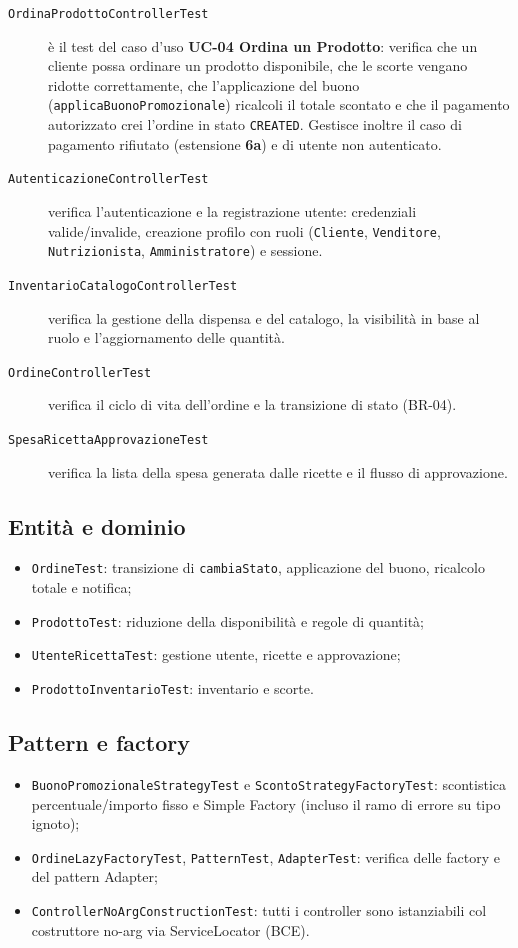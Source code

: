 \begin{description}
    \item[\texttt{OrdinaProdottoControllerTest}] è il test del caso d'uso
    \textbf{UC-04 Ordina un Prodotto}: verifica che un cliente possa ordinare
    un prodotto disponibile, che le scorte vengano ridotte correttamente, che
    l'applicazione del buono (\texttt{applicaBuonoPromozionale}) ricalcoli il
    totale scontato e che il pagamento autorizzato crei l'ordine in stato
    \texttt{CREATED}. Gestisce inoltre il caso di pagamento rifiutato
    (estensione \textbf{6a}) e di utente non autenticato.
    \item[\texttt{AutenticazioneControllerTest}] verifica l'autenticazione e la
    registrazione utente: credenziali valide/invalide, creazione profilo con
    ruoli (\texttt{Cliente}, \texttt{Venditore}, \texttt{Nutrizionista},
    \texttt{Amministratore}) e sessione.
    \item[\texttt{InventarioCatalogoControllerTest}] verifica la gestione della
    dispensa e del catalogo, la visibilità in base al ruolo e l'aggiornamento
    delle quantità.
    \item[\texttt{OrdineControllerTest}] verifica il ciclo di vita
    dell'ordine e la transizione di stato (BR-04).
    \item[\texttt{SpesaRicettaApprovazioneTest}] verifica la lista della spesa
    generata dalle ricette e il flusso di approvazione.
\end{description}

\subsection{Entità e dominio}
\begin{itemize}
    \item \texttt{OrdineTest}: transizione di \texttt{cambiaStato}, applicazione
    del buono, ricalcolo totale e notifica;
    \item \texttt{ProdottoTest}: riduzione della disponibilità e regole di
    quantità;
    \item \texttt{UtenteRicettaTest}: gestione utente, ricette e approvazione;
    \item \texttt{ProdottoInventarioTest}: inventario e scorte.
\end{itemize}

\subsection{Pattern e factory}
\begin{itemize}
    \item \texttt{BuonoPromozionaleStrategyTest} e \texttt{ScontoStrategyFactoryTest}:
    scontistica percentuale/importo fisso e Simple Factory (incluso il ramo di
    errore su tipo ignoto);
    \item \texttt{OrdineLazyFactoryTest}, \texttt{PatternTest},
    \texttt{AdapterTest}: verifica delle factory e del pattern Adapter;
    \item \texttt{ControllerNoArgConstructionTest}: tutti i controller sono
    istanziabili col costruttore no-arg via ServiceLocator (BCE).
\end{itemize}

